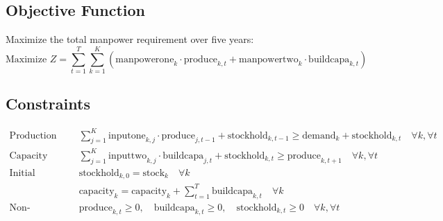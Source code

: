 \documentclass{article}
\begin{document}
\subsection*{Objective Function}
Maximize the total manpower requirement over five years:
\[
\text{Maximize } Z = \sum_{t=1}^{T} \sum_{k=1}^{K} \left( \text{manpowerone}_{k} \cdot \text{produce}_{k,t} + \text{manpowertwo}_{k} \cdot \text{buildcapa}_{k,t} \right)
\]

\subsection*{Constraints}
\begin{align}
\text{Production Constraints:} & \quad \sum_{j=1}^{K} \text{inputone}_{k,j} \cdot \text{produce}_{j,t-1} + \text{stockhold}_{k,t-1} \geq \text{demand}_{k} + \text{stockhold}_{k,t} \quad \forall k, \forall t \\
\text{Capacity Building Constraints:} & \quad \sum_{j=1}^{K} \text{inputtwo}_{k,j} \cdot \text{buildcapa}_{j,t} + \text{stockhold}_{k,t} \geq \text{produce}_{k,t+1} \quad \forall k, \forall t \\
\text{Initial Conditions:} & \quad \text{stockhold}_{k,0} = \text{stock}_{k} \quad \forall k \\
& \quad \text{capacity}_{k} = \text{capacity}_{k} + \sum_{t=1}^{T} \text{buildcapa}_{k,t}  \quad \forall k \\
\text{Non-negativity:} & \quad \text{produce}_{k,t} \geq 0, \quad \text{buildcapa}_{k,t} \geq 0, \quad \text{stockhold}_{k,t} \geq 0 \quad \forall k, \forall t 
\end{align}
\end{document}
